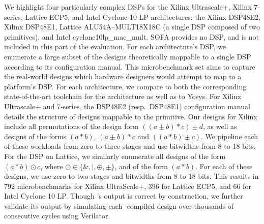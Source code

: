 We highlight four particularly complex
  DSPs for the Xilinx Ultrascale+,
  Xilinx 7-series,
  Lattice ECP5,
  and Intel Cyclone 10 LP architectures: 
  the Xilinx DSP48E2,
  Xilinx DSP48E1,
  Lattice ALU54A--MULT18X18C 
  (a single DSP composed of 
  two primitives),
  and Intel cyclone10lp\_mac\_mult.
SOFA provides no DSP, and is not included
  in this part of the evaluation.
For each architecture's DSP,
  we enumerate a large subset 
  of the designs
  theoretically mappable
  to a single DSP 
  according to its
  configuration manual.
This microbenchmark set
  aims to capture
  the real-world designs
  which hardware designers
  would attempt to map
  to a platform's DSP.
For each architecture, we compare \lr
  to both the corresponding
  state-of-the-art toolchain for
  the architecture 
  as well as to Yosys.
For Xilinx Ultrascale+ and 7-series, 
  the DSP48E2 (resp.~DSP48E1) configuration manual details the
  structure of designs mappable
  to the primitive.
Our designs for Xilinx include 
  all permutations of the design form
  $((a \pm b) * c) \pm d$,
  as well as designs of the forms $(a * b)$, $(a\pm b) * c$ and $((a * b) \pm c)$.
We pipeline each of these
  workloads from zero to three stages 
  and use bitwidths from 8 to 18 bits.
For the DSP on Lattice, we similarly enumerate
  all designs of the form $(a * b) \odot c$, 
  where $\odot \in \{\&, |, \oplus, \pm\}$, and of the form $(a * b)$.
For each of these designs, 
  we use zero to two stages
  and bitwidths from 8 to 18 bits.
This results in
    792 microbenchmarks for Xilinx UltraScale+,
    396 for Lattice ECP5,
    and 66 for Intel Cyclone 10 LP.
Though \lr's output is correct by construction,
  we further validate its output
  by simulating each \lr-compiled design
  over thousands of consecutive cycles
  using Verilator.\tighten
  

